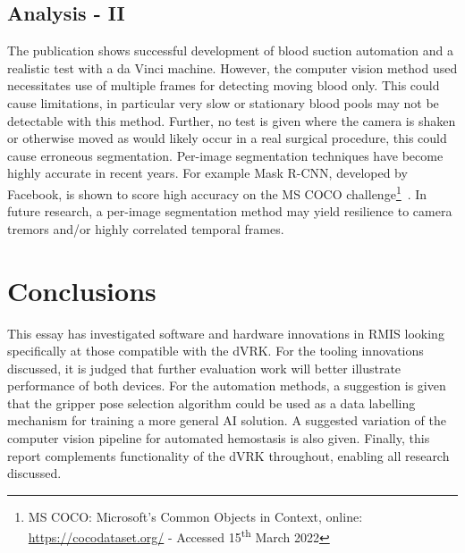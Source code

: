 \documentclass[english]{sobraep}
\begin{document}
\subsection{Analysis - II}
The publication shows successful development of blood suction automation and a realistic test with a da Vinci machine. However, the computer vision method used necessitates use of multiple frames for detecting moving blood only. This could cause limitations, in particular very slow or stationary blood pools may not be detectable with this method. Further, no test is given where the camera is shaken or otherwise moved as would likely occur in a real surgical procedure, this could cause erroneous segmentation. Per-image segmentation techniques have become highly accurate in recent years. For example Mask R-CNN, developed by Facebook, is shown to score high accuracy on the MS COCO challenge\footnote{MS COCO: Microsoft's Common Objects in Context, online: \url{https://cocodataset.org/} - Accessed 15\textsuperscript{th} March 2022}~\cite{mask-rcnn}. In future research, a per-image segmentation method may yield resilience to camera tremors and/or highly correlated temporal frames. 


\section{Conclusions}
This essay has investigated software and hardware innovations in RMIS looking specifically at those compatible with the dVRK. For the tooling innovations discussed, it is judged that further evaluation work will better illustrate performance of both devices. For the automation methods, a suggestion is given that the gripper pose selection algorithm could be used as a data labelling mechanism for training a more general AI solution. A suggested variation of the computer vision pipeline for automated hemostasis is also given. Finally, this report complements functionality of the dVRK throughout, enabling all research discussed.
\printbibliography
\end{document}
